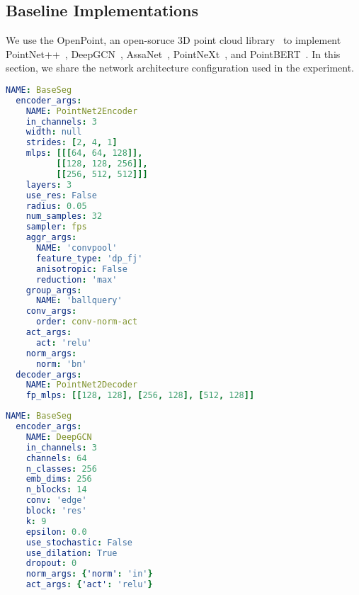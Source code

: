 \subsection{Baseline Implementations}

We use the OpenPoint, an open-soruce 3D point cloud library~\citep{qian2022pointnext} to implement PointNet++~\citep{qi2017pointnet++}, DeepGCN~\citep{li2019deepgcns}, AssaNet~\citep{qian2021assanet}, PointNeXt~\citep{qian2022pointnext}, and PointBERT~\citep{yu2022point}. In this section, we share the network architecture configuration used in the experiment.

\begin{minipage}{\linewidth}
\begin{lstlisting}[language=yaml, caption=\textbf{PointNet++ Configuration}, label=lst:pointnetpp_config]
  NAME: BaseSeg
  encoder_args:
    NAME: PointNet2Encoder
    in_channels: 3
    width: null
    strides: [2, 4, 1]
    mlps: [[[64, 64, 128]],
          [[128, 128, 256]],
          [[256, 512, 512]]]
    layers: 3
    use_res: False
    radius: 0.05
    num_samples: 32
    sampler: fps
    aggr_args:
      NAME: 'convpool'
      feature_type: 'dp_fj'
      anisotropic: False
      reduction: 'max'
    group_args:
      NAME: 'ballquery'
    conv_args: 
      order: conv-norm-act
    act_args:
      act: 'relu'
    norm_args:
      norm: 'bn'
  decoder_args:
    NAME: PointNet2Decoder
    fp_mlps: [[128, 128], [256, 128], [512, 128]]

\end{lstlisting}
\end{minipage}



\begin{minipage}{\linewidth}
\begin{lstlisting}[language=yaml, caption=\textbf{DeepGCN Configuration}, label=lst:deepgcn_config]
  NAME: BaseSeg
  encoder_args:
    NAME: DeepGCN
    in_channels: 3
    channels: 64
    n_classes: 256 
    emb_dims: 256
    n_blocks: 14
    conv: 'edge'
    block: 'res'
    k: 9
    epsilon: 0.0
    use_stochastic: False
    use_dilation: True 
    dropout: 0
    norm_args: {'norm': 'in'}
    act_args: {'act': 'relu'}
\end{lstlisting}
\end{minipage}



